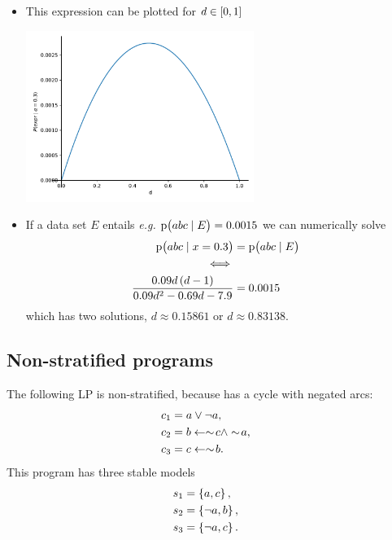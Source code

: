 \documentclass{beamer}
\newcommand{\naf}{\ensuremath{\sim\!}}
\newcommand{\larr}{\ensuremath{\leftarrow}}
\newcommand{\at}[1]{\ensuremath{\!\del{#1}}}
\newcommand{\pr}[1]{\ensuremath{\mathrm{p}\at{#1}}}
\begin{document}
\begin{frame}
\begin{itemize}
        \item This expression can be plotted for $d\in\intcc{0,1}$
        \begin{center}
            \includegraphics[height=15em]{Pabc_alpha03.pdf}
        \end{center} 
        
        \item If a data set $E$ entails \emph{e.g.} $\pr{abc \mid E} = 0.0015$ we can numerically solve
        $$
        \begin{aligned}
            \pr{abc \mid x = 0.3} &= \pr{abc \mid E} \cr
            \iff\cr
            \frac{0.09 d \del{d - 1}}{0.09 d^{2} - 0.69 d - 7.9} &= 0.0015
        \end{aligned}
        $$
        which has two solutions, $d \approx 0.15861$ or $d \approx 0.83138$.
    \end{itemize}
\end{frame}
\subsection{Non-stratified programs}
\begin{frame}
    The following LP is non-stratified, because has a cycle with negated arcs:
    $$
    \begin{aligned}
        c_1 &= a\lor \neg a,\cr
        c_2 &= b \larr \naf c \land \naf a, \cr
        c_3 &= c \larr \naf b.
    \end{aligned}
    $$    
    This program has three stable models
    $$
    \begin{aligned}
    s_1 &= \set{ a, c }, \cr
    s_2 &= \set{ \neg a, b }, \cr
    s_3 &= \set{ \neg a, c }.
    \end{aligned}
    $$
\end{frame}
\end{document}
